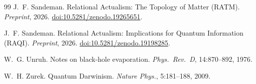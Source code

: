 \documentclass[11pt,a4paper]{article}
\theoremstyle{plain}
\theoremstyle{definition}
\theoremstyle{remark}
\begin{document}
\begin{thebibliography}{99}
J.~F. Sandeman.
\newblock Relational Actualism: The Topology of Matter (RATM).
\newblock \textit{Preprint}, 2026.
\newblock \href{https://doi.org/10.5281/zenodo.19265651}{doi:10.5281/zenodo.19265651}.

J.~F. Sandeman.
\newblock Relational Actualism: Implications for Quantum Information (RAQI).
\newblock \textit{Preprint}, 2026.
\newblock \href{https://doi.org/10.5281/zenodo.19198285}{doi:10.5281/zenodo.19198285}.

W.~G. Unruh.
\newblock Notes on black-hole evaporation.
\newblock \textit{Phys.\ Rev.\ D}, 14:870--892, 1976.

W.~H. Zurek.
\newblock Quantum Darwinism.
\newblock \textit{Nature Phys.}, 5:181--188, 2009.

\end{thebibliography}
\end{document}
